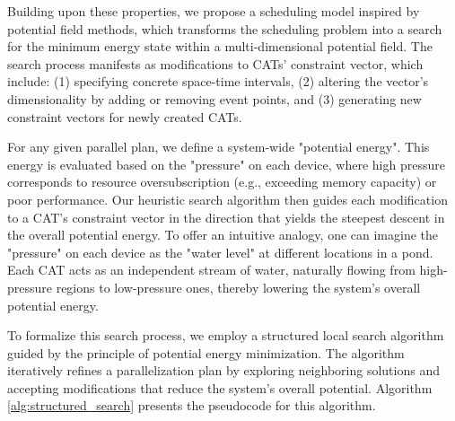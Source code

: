 \documentclass[letterpaper,twocolumn,10pt]{article}
\begin{document}

Building upon these properties, we propose a scheduling model inspired by potential field methods, which transforms the scheduling problem into a search for the minimum energy state within a multi-dimensional potential field. The search process manifests as modifications to CATs' constraint vector, which include: (1) specifying concrete space-time intervals, (2) altering the vector's dimensionality by adding or removing event points, and (3) generating new constraint vectors for newly created CATs.

For any given parallel plan, we define a system-wide "potential energy". This energy is evaluated based on the "pressure" on each device, where high pressure corresponds to resource oversubscription (e.g., exceeding memory capacity) or poor performance. Our heuristic search algorithm then guides each modification to a CAT's constraint vector in the direction that yields the steepest descent in the overall potential energy. To offer an intuitive analogy, one can imagine the "pressure" on each device as the "water level" at different locations in a pond. Each CAT acts as an independent stream of water, naturally flowing from high-pressure regions to low-pressure ones, thereby lowering the system's overall potential energy.

To formalize this search process, we employ a structured local search algorithm guided by the principle of potential energy minimization. The algorithm iteratively refines a parallelization plan by exploring neighboring solutions and accepting modifications that reduce the system's overall potential. Algorithm \ref{alg:structured_search} presents the pseudocode for this algorithm.
\end{document}
